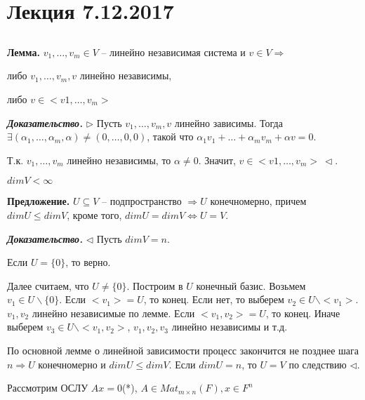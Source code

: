 \section{Лекция 7.12.2017}

\subsection{}

\textbf{Лемма.} $v_1, \dots, v_m \in V$ -- линейно независимая система и $v \in V \Rightarrow$

либо $v_1, \dots, v_m, v$ линейно независимы,

либо $v \in <v1, \dots, v_m>$

\vspace{\baselineskip}
\textbf{\textit{Доказательство.}} $\rhd$ Пусть $v_1, \dots, v_m, v$ линейно зависимы. Тогда $\exists (\alpha_1, \dots, \alpha_m, \alpha) \neq (0, \dots, 0, 0)$, такой что $\alpha_1 v_1 + \dots + \alpha_m v_m + \alpha v = 0$.

Т.к. $v_1, \dots, v_m$ линейно независимы, то $\alpha \neq 0$. Значит, $v \in <v1, \dots, v_m> \ \lhd$.

$dimV < \infty$

\vspace{\baselineskip}
\textbf{Предложение.} $U \subseteq V$ -- подпространство $\Rightarrow U$ конечномерно, причем $dim U \leq dim V$, кроме того, $dimU = dimV \Leftrightarrow U = V$.

\vspace{\baselineskip}
\textbf{\textit{Доказательство.}} $\lhd$ Пусть $dimV = n$.

Если $U = \{0\}$, то верно.

Далее считаем, что $U \neq \{0\}$. Построим в $U$ конечный базис. Возьмем $v_1 \in U \backslash \{0\}$. Если $<v_1> = U$, то конец. Если нет, то выберем $v_2 \in U \backslash <v_1>$. $v_1, v_2$ линейно независимые по лемме. Если $<v_1, v_2> = U$, то конец. Иначе выберем $v_3 \in U \backslash <v_1, v_2>$, $v_1, v_2, v_3$ линейно независимы и т.д.

\vspace{\baselineskip}
По основной лемме о линейной зависимости процесс закончится не позднее шага $n \Rightarrow U$ конечномерно и $dimU \leq dimV$. Если $dimU = n$, то $U = V$ по следствию $\lhd$. 

\vspace{\baselineskip}
Рассмотрим ОСЛУ $Ax = 0$(*), $A \in Mat_{m \times n} (F), x \in F^n$

